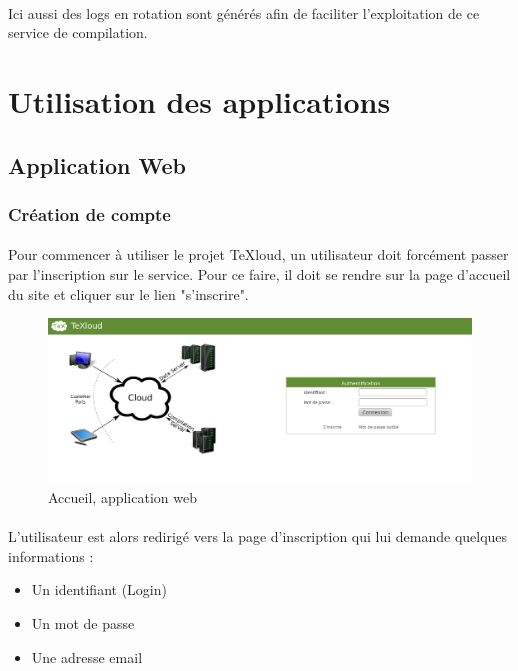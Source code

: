 \documentclass[a4paper,12pt]{article}
\begin{document}
\paragraph*{}
Ici aussi des logs en rotation sont générés afin de faciliter l'exploitation de ce service de compilation.


\newpage
\section{Utilisation des applications}
\subsection{Application Web}
\subsubsection{Création de compte}
\paragraph*{}
Pour commencer à utiliser le projet TeXloud, un utilisateur doit forcément passer par l'inscription sur le service. Pour ce faire, il doit se rendre sur la page d'accueil du site et cliquer sur le lien "s'inscrire".

\begin{figure}[!ht]
\begin{center}
  \includegraphics[width=1\textwidth]{./images/screenshot/Acceuil.png}
\end{center}
  \caption{Accueil, application web}
  \label{acceuilWeb}
\end{figure}

\clearpage
\paragraph*{}
L'utilisateur est alors redirigé vers la page d'inscription qui lui demande quelques informations :
\begin{itemize}
 \item Un identifiant (Login)
 \item Un mot de passe 
 \item Une adresse email
\end{itemize}
\end{document}
